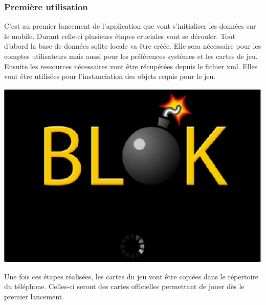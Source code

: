 		\subsubsection{Première utilisation}
	C'est au premier lancement de l'application que vont s'initialiser les données sur le mobile.
	Durant celle-ci plusieurs étapes cruciales vont se dérouler. Tout d'abord la
	base de données \gls{sqlite} locale va être créée. Elle sera nécessaire pour les
	comptes utilisateurs mais aussi pour les préférences systèmes et les cartes de jeu.
	Ensuite les ressources nécessaires vont être récupérées depuis le fichier \gls{xml}.
	Elles vont être utilisées pour l'instanciation des objets requis pour le jeu. 
		\begin{center}						
			\includegraphics[scale=0.6]{Developpement/Img/1.eps}
		\end{center}
	Une fois ces étapes réalisées, les cartes du jeu vont être copiées dans
	le répertoire du téléphone. Celles-ci seront des cartes officielles permettant
	de jouer dès le premier lancement.
	
